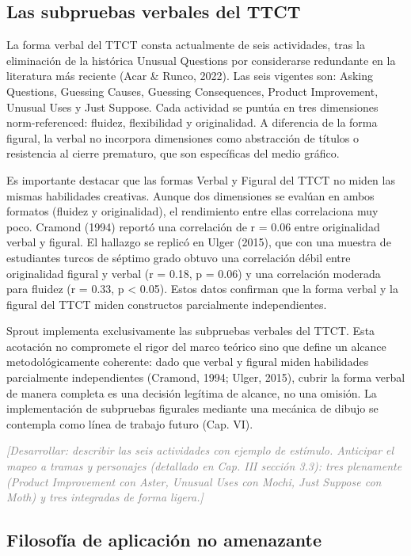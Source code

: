 \documentclass[12pt,twoside,titlepage]{report}
\begin{document}
\subsection{Las subpruebas verbales del TTCT}

La forma verbal del TTCT consta actualmente de seis actividades, tras la eliminación de la histórica Unusual Questions por considerarse redundante en la literatura más reciente (Acar \& Runco, 2022). Las seis vigentes son: Asking Questions, Guessing Causes, Guessing Consequences, Product Improvement, Unusual Uses y Just Suppose. Cada actividad se puntúa en tres dimensiones norm-referenced: fluidez, flexibilidad y originalidad. A diferencia de la forma figural, la verbal no incorpora dimensiones como abstracción de títulos o resistencia al cierre prematuro, que son específicas del medio gráfico.

Es importante destacar que las formas Verbal y Figural del TTCT no miden las mismas habilidades creativas. Aunque dos dimensiones se evalúan en ambos formatos (fluidez y originalidad), el rendimiento entre ellas correlaciona muy poco. Cramond (1994) reportó una correlación de r = 0.06 entre originalidad verbal y figural. El hallazgo se replicó en Ulger (2015), que con una muestra de estudiantes turcos de séptimo grado obtuvo una correlación débil entre originalidad figural y verbal (r = 0.18, p = 0.06) y una correlación moderada para fluidez (r = 0.33, p < 0.05). Estos datos confirman que la forma verbal y la figural del TTCT miden constructos parcialmente independientes.

Sprout implementa exclusivamente las subpruebas verbales del TTCT. Esta acotación no compromete el rigor del marco teórico sino que define un alcance metodológicamente coherente: dado que verbal y figural miden habilidades parcialmente independientes (Cramond, 1994; Ulger, 2015), cubrir la forma verbal de manera completa es una decisión legítima de alcance, no una omisión. La implementación de subpruebas figurales mediante una mecánica de dibujo se contempla como línea de trabajo futuro (Cap. VI).

\textcolor{gray}{\textit{[Desarrollar: describir las seis actividades con ejemplo de estímulo. Anticipar el mapeo a tramas y personajes (detallado en Cap. III sección 3.3): tres plenamente (Product Improvement con Aster, Unusual Uses con Mochi, Just Suppose con Moth) y tres integradas de forma ligera.]}}

\subsection{Filosofía de aplicación no amenazante}
\end{document}
